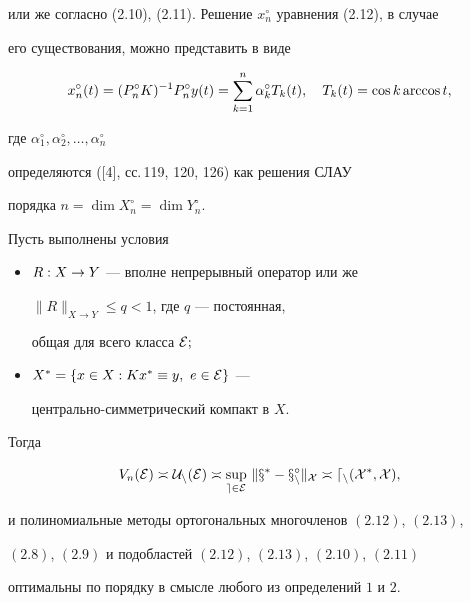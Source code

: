 или же согласно (2.10), (2.11). Решение $x_n^\circ$ уравнения (2.12), в случае


его существования, можно представить в виде


\begin{equation}


x_n^\circ (t)=(P_n^\circ K)^{-1}P_n^\circ y(t)=


\sum_{k=1}^n\alpha_k^\circ T_k(t),\quad


T_k(t)=\cos{k\text{\,arccos\,}t},


\end{equation}


где $\alpha^\circ_1,\alpha^\circ_2,\dotsc,\alpha^\circ_n$


определяются ([4], сс.\,119, 120, 126) как решения СЛАУ


порядка $n=\dim X^\circ_n=\dim Y^\circ_n$.





\begin{thms}


Пусть выполнены условия


\begin{itemize}


\item[а)] $R : X \to Y$ --- вполне непрерывный оператор или же


$\|R\|_{X\rightarrow Y}\leq q<1$, где $q$ --- постоянная,


общая для всего класса $\cal E;$


\item[б)] $X^*=\{ x\in X : Kx^*\equiv y,\ e\in \cal E\}$ ---


центрально-симметрический компакт в $X$.


\end{itemize}


Тогда


\begin{equation}


V_n(\cal E)\asymp U_n(\cal E)\asymp \sup_{e\in \cal E}\,


\|x^*-x_n^\circ\|_X \asymp d_n(X^*,X),


\end{equation}


и полиномиальные методы ортогональных многочленов $(2.12)$, $(2.13)$,


$(2.8)$, $(2.9)$ и подобластей $(2.12)$, $(2.13)$, $(2.10)$, $(2.11)$


оптимальны по порядку в смысле любого из определений $1$ и $2$.


\end{thms}





